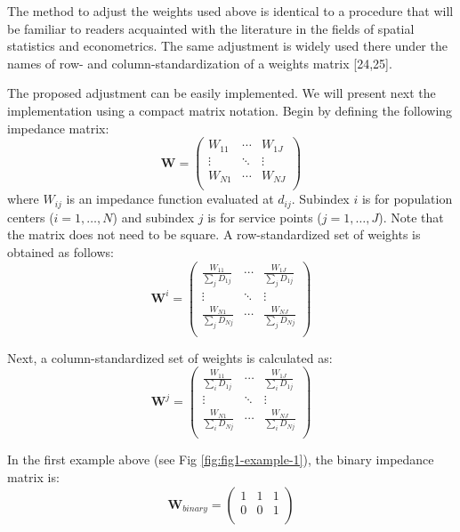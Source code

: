 \documentclass[10pt,letterpaper]{article}
\begin{document}
The method to adjust the weights used above is identical to a procedure
that will be familiar to readers acquainted with the literature in the
fields of spatial statistics and econometrics. The same adjustment is
widely used there under the names of row- and column-standardization of
a weights matrix {[}24,25{]}.

The proposed adjustment can be easily implemented. We will present next
the implementation using a compact matrix notation. Begin by defining
the following impedance matrix: \[
\mathbf{W} = \left(\begin{array}{ccc}
            W_{11} & \cdots & W_{1J}\\
            \vdots & \ddots & \vdots\\
            W_{N1} & \cdots & W_{NJ}\\
        \end{array}
        \right)
\] where \(W_{ij}\) is an impedance function evaluated at \(d_{ij}\).
Subindex \(i\) is for population centers (\(i=1,\dots,N\)) and subindex
\(j\) is for service points (\(j=1,\dots,J\)). Note that the matrix does
not need to be square. A row-standardized set of weights is obtained as
follows: \[
\mathbf{W}^{i} = \left(\begin{array}{ccc}
            \frac{W_{11}}{\sum_jD_{1j}} & \cdots & \frac{W_{1J}}{\sum_jD_{1j}}\\
            \vdots & \ddots & \vdots\\
            \frac{W_{N1}}{\sum_jD_{Nj}} & \cdots & \frac{W_{NJ}}{\sum_jD_{Nj}}\\
        \end{array}
        \right)
\]

Next, a column-standardized set of weights is calculated as: \[
\mathbf{W}^{j} = \left(\begin{array}{ccc}
            \frac{W_{11}}{\sum_iD_{1j}} & \cdots & \frac{W_{1J}}{\sum_iD_{1j}}\\
            \vdots & \ddots & \vdots\\
            \frac{W_{N1}}{\sum_iD_{Nj}} & \cdots & \frac{W_{NJ}}{\sum_iD_{Nj}}\\
        \end{array}
        \right)
\]

In the first example above (see Fig \ref{fig:fig1-example-1}), the
binary impedance matrix is: \[
\mathbf{W}_{binary} = \left(\begin{array}{ccc}
            1 & 1 & 1\\
            0 & 0 & 1\\
        \end{array}
        \right)
\]
\end{document}
